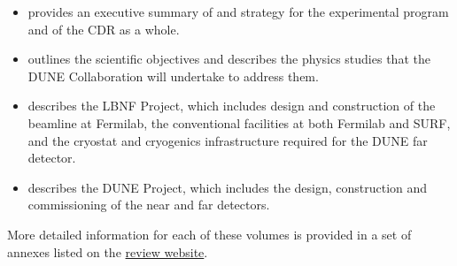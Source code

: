 \begin{itemize}
\item \volintro{} provides an executive summary of and strategy for the experimental 
program and of the CDR as a whole.
\item \volphys{} outlines the scientific objectives and describes the physics studies that 
the DUNE Collaboration will undertake to address them.
\item \vollbnf{} describes the LBNF Project, which includes design and construction of the 
beamline at Fermilab, the conventional facilities at both Fermilab and SURF, and the cryostat
 and cryogenics infrastructure required for the DUNE far detector.
\item \voldune{} describes the DUNE Project, which includes the design, construction and 
commissioning of the near and far detectors. 
\end{itemize}

More detailed information for each of these volumes is provided in a set of annexes listed on the \href{https://web.fnal.gov/project/LBNF/ReviewsAndAssessments/LBNF-DUNE%20CD-1-Refresh%20Directors%20Review/SitePages/Home.aspx}{review website}. 


